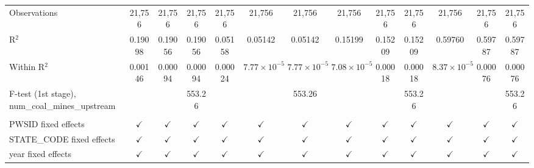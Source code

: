 \begin{table}[htbp]
\begin{adjustbox}{width = \textwidth, center}
\begin{tabular}{lcccccccccccc}
          \\
         
         Observations                                      & 21,756        & 21,756        & 21,756        & 21,756        & 21,756                & 21,756                & 21,756                & 21,756        & 21,756        & 21,756                & 21,756        & 21,756\\  
         R$^2$                                             & 0.19098       & 0.19056       & 0.19056       & 0.05158       & 0.05142               & 0.05142               & 0.15199               & 0.15209       & 0.15209       & 0.59760               & 0.59787       & 0.59787\\  
         Within R$^2$                                      & 0.00146       & 0.00094       & 0.00094       & 0.00024       & $7.77\times 10^{-5}$  & $7.77\times 10^{-5}$  & $7.08\times 10^{-5}$  & 0.00018       & 0.00018       & $8.37\times 10^{-5}$  & 0.00076       & 0.00076\\  
         F-test (1st stage), num\_coal\_mines\_upstream    &               &               & 553.26        &               &                       & 553.26                &                       &               & 553.26        &                       &               & 553.26\\  
         
          \\
         
         PWSID fixed effects                               & $\checkmark$  & $\checkmark$  & $\checkmark$  & $\checkmark$  & $\checkmark$          & $\checkmark$          & $\checkmark$          & $\checkmark$  & $\checkmark$  & $\checkmark$          & $\checkmark$  & $\checkmark$\\   
         STATE\_CODE fixed effects                         & $\checkmark$  & $\checkmark$  & $\checkmark$  & $\checkmark$  & $\checkmark$          & $\checkmark$          & $\checkmark$          & $\checkmark$  & $\checkmark$  & $\checkmark$          & $\checkmark$  & $\checkmark$\\   
         year fixed effects                                & $\checkmark$  & $\checkmark$  & $\checkmark$  & $\checkmark$  & $\checkmark$          & $\checkmark$          & $\checkmark$          & $\checkmark$  & $\checkmark$  & $\checkmark$          & $\checkmark$  & $\checkmark$\\   
         
         \bottomrule
         

\end{tabular}
\end{adjustbox}
\end{table}

